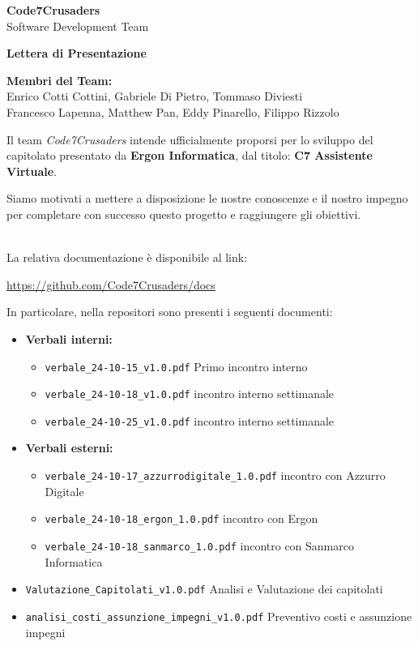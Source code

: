\documentclass{article}
\begin{document}
\begin{titlepage}
    {\Huge \textbf{Code7Crusaders}}\\
    \vspace{0.5cm}
    {\Large Software Development Team}\\
    \vspace{2cm}
    
    {\large \textbf{Lettera di Presentazione}}\\
    \vspace{5cm}

    \textbf{Membri del Team:}\\
    Enrico Cotti Cottini, Gabriele Di Pietro, Tommaso Diviesti \\
    Francesco Lapenna, Matthew Pan, Eddy Pinarello, Filippo Rizzolo \\
    \vspace{0.5cm}
    
    \vspace{1cm}
\end{titlepage}


Il team \textit{Code7Crusaders} intende ufficialmente proporsi per lo sviluppo del capitolato presentato da \textbf{Ergon Informatica}, 
dal titolo: \textbf{C7 Assistente Virtuale}.

Siamo motivati a mettere a disposizione le nostre conoscenze e il nostro impegno 
per completare con successo questo progetto e raggiungere gli obiettivi.

\\
La relativa documentazione è disponibile al link:
\begin{center}
    \url{https://github.com/Code7Crusaders/docs}
\end{center}
In particolare, nella repositori sono presenti i seguenti documenti:
\begin{itemize}
    \item \textbf{Verbali interni:}
    \begin{itemize}
        \item \texttt{verbale\_24-10-15\_v1.0.pdf} Primo incontro interno
        \item \texttt{verbale\_24-10-18\_v1.0.pdf} incontro interno settimanale
        \item \texttt{verbale\_24-10-25\_v1.0.pdf} incontro interno settimanale
    \end{itemize}
    \item \textbf{Verbali esterni:}
    \begin{itemize}
        \item \texttt{verbale\_24-10-17\_azzurrodigitale\_1.0.pdf} incontro con Azzurro Digitale
        \item \texttt{verbale\_24-10-18\_ergon\_1.0.pdf} incontro con Ergon
        \item \texttt{verbale\_24-10-18\_sanmarco\_1.0.pdf} incontro con Sanmarco Informatica
    \end{itemize}
    \item \texttt{Valutazione\_Capitolati\_v1.0.pdf} Analisi e Valutazione dei capitolati 
    \item \texttt{analisi\_costi\_assunzione\_impegni\_v1.0.pdf} Preventivo costi e assunzione impegni
\end{itemize}
\end{document}
